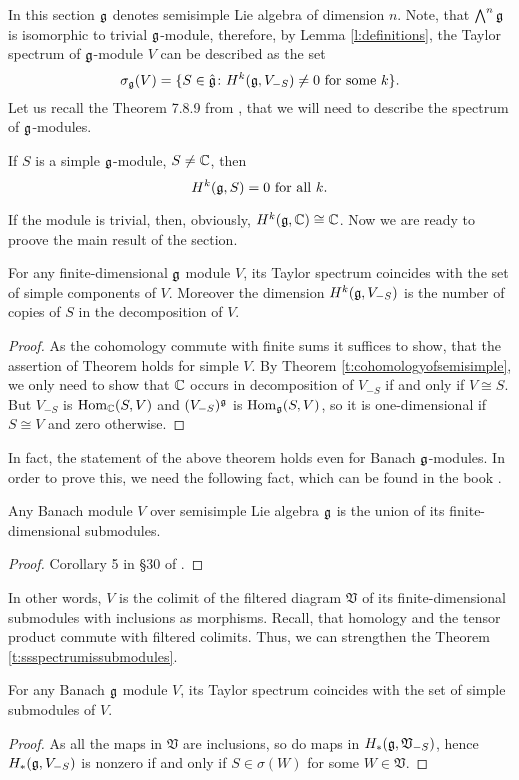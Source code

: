 In this section $\mathfrak{g}$ denotes semisimple Lie algebra of dimension $n$. Note, that $\bigwedge^n
\mathfrak{g}$ is isomorphic to trivial $\mathfrak{g}$-module, therefore, by Lemma \ref{l:definitions}, the Taylor
spectrum of $\mathfrak{g}$-module $V$ can be described as the set
\[
    \sigma_{\mathfrak{g}}(V) = \{ S \in \hat{\mathfrak{g}} \colon H^k(\mathfrak{g}, V_{-S})\neq 0 \text{ for some } k\}.
\]
Let us recall the Theorem 7.8.9 from , that we will need to describe the spectrum
of $\mathfrak{g}$-modules.
\begin{theorem} \label{t:cohomologyofsemisimple}
If $S$ is a simple $\mathfrak{g}$-module, $S \neq \mathbb{C}$, then 
\[
    H^k(\mathfrak{g}, S) = 0 \text{ for all } k.
\]
\end{theorem}
If the module is trivial, then, obviously, $H^k(\mathfrak{g}, \mathbb{C}) \cong \mathbb{C}$. Now we are ready to proove
the main result of the section.
\begin{theorem} \label{t:ssspectrumissubmodules}
    For any finite-dimensional $\mathfrak{g}$ module $V$, its Taylor spectrum coincides with the set of
    simple components of $V$. Moreover the dimension $H^k(\mathfrak{g}, V_{-S})$ is the number of copies
    of $S$ in the decomposition of $V$.
\end{theorem}
\begin{proof}
    As the cohomology commute with finite sums it suffices to show, that the assertion of Theorem holds for
    simple $V$. By Theorem \ref{t:cohomologyofsemisimple}, we only need to show that $\mathbb{C}$ occurs
    in decomposition of $V_{-S}$ if and only if $V\cong S$. But $V_{-S}$ is $\operatorname{Hom}_{\mathbb{C}}(S, V)$ and
    $(V_{-S})^{\mathfrak{g}}$ is $\operatorname{Hom}_{\mathfrak{g}}(S, V)$, so it is one-dimensional if $S\cong V$ and zero
    otherwise.
\end{proof}
In fact, the statement of the above theorem holds even for Banach $\mathfrak{g}$-modules. In order to
prove this, we need the following fact, which can be found in the book .

\begin{theorem}
    Any Banach module $V$ over semisimple Lie algebra $\mathfrak{g}$ is the union of its
    finite-dimensional submodules. 
\end{theorem}
\begin{proof}
    Corollary 5 in \S30 of .
\end{proof}
In other words, $V$ is the colimit of the filtered diagram $\mathfrak{V}$ of its finite-dimensional submodules
with inclusions as morphisms. Recall, that homology and the tensor product commute with filtered
colimits. Thus, we can strengthen the Theorem \ref{t:ssspectrumissubmodules}.
\begin{corollary}
    For any Banach $\mathfrak{g}$ module $V$, its Taylor spectrum coincides with the set of
    simple submodules of $V$. 
\end{corollary}
\begin{proof}
    As all the maps in $\mathfrak{V}$ are inclusions, so do maps in $H_*(\mathfrak{g}, \mathfrak{V}_{-S})$,
    hence $H_*(\mathfrak{g}, V_{-S})$ is nonzero if and only if $S \in \sigma(W)$ for some $W\in
    \mathfrak{V}$.
\end{proof}
